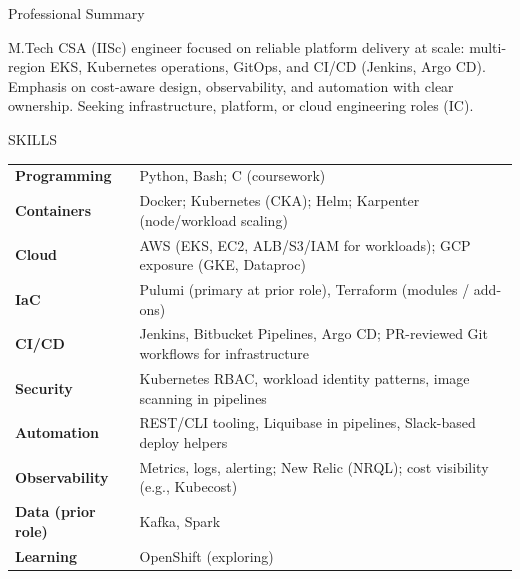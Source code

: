 \documentclass{resume} %
\begin{document}

\begin{rSection}{Professional Summary}

{M.Tech CSA (IISc) engineer focused on reliable platform delivery at scale: multi-region EKS, Kubernetes operations, GitOps, and CI/CD (Jenkins, Argo CD). Emphasis on cost-aware design, observability, and automation with clear ownership. Seeking infrastructure, platform, or cloud engineering roles (IC).}

\end{rSection}



\begin{rSection}{SKILLS}

\begin{tabular}{ @{} >{\bfseries}l @{\hspace{6ex}} l }
Programming & Python, Bash; C (coursework) \\
Containers & Docker; Kubernetes (CKA); Helm; Karpenter (node/workload scaling) \\
Cloud & AWS (EKS, EC2, ALB/S3/IAM for workloads); GCP exposure (GKE, Dataproc) \\
IaC & Pulumi (primary at prior role), Terraform (modules / add-ons) \\
CI/CD & Jenkins, Bitbucket Pipelines, Argo CD; PR-reviewed Git workflows for infrastructure \\
Security & Kubernetes RBAC, workload identity patterns, image scanning in pipelines \\
Automation & REST/CLI tooling, Liquibase in pipelines, Slack-based deploy helpers \\
Observability & Metrics, logs, alerting; New Relic (NRQL); cost visibility (e.g., Kubecost) \\
Data (prior role) & Kafka, Spark \\
Learning & OpenShift (exploring)
\end{tabular}

\end{rSection}
\end{document}
